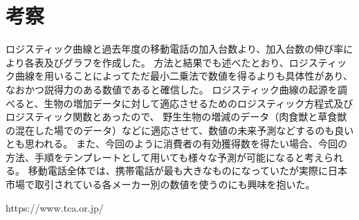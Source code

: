 \documentclass[uplatex, titlepage]{jsarticle}
\begin{document}
\section{考察}

   ロジスティック曲線と過去年度の移動電話の加入台数より、加入台数の伸び率により各表及びグラフを作成した。
方法と結果でも述べたとおり、ロジスティック曲線を用いることによってただ最小二乗法で数値を得るよりも具体性があり、なおかつ説得力のある数値であると確信した。
ロジスティック曲線の起源を調べると、生物の増加データに対して適応させるためのロジスティック方程式及びロジスティック関数とあったので、
野生生物の増減のデータ（肉食獣と草食獣の混在した場でのデータ）などに適応させて、数値の未来予測などするのも良いとも思われる。
また、今回のように消費者の有効獲得数を得たい場合、今回の方法、手順をテンプレートとして用いても様々な予測が可能になると考えられる。
移動電話全体では、携帯電話が最も大きなものになっていたが実際に日本市場で取引されている各メーカー別の数値を使うのにも興味を抱いた。

\begin{thebibliography}{99}
https://www.tca.or.jp/

  \end{thebibliography}
\end{document}
